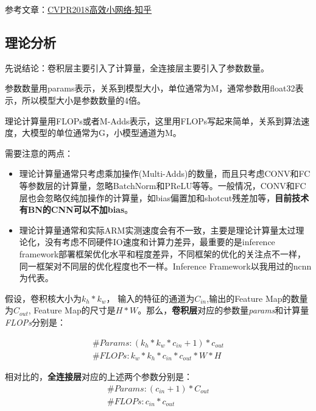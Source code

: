 参考文章：\href{https://zhuanlan.zhihu.com/p/37074222}{CVPR2018高效小网络-知乎}

\subsection{理论分析}

先说结论：卷积层主要引入了计算量，全连接层主要引入了参数数量。

参数数量用params表示，关系到模型大小，单位通常为M，通常参数用float32表示，所以模型大小是参数数量的4倍。

理论计算量用FLOPs或者M-Adds表示，这里用FLOPs写起来简单，关系到算法速度，大模型的单位通常为G，小模型通道为M。

需要注意的两点：
\begin{itemize}
\item 理论计算量通常只考虑乘加操作(Multi-Adds)的数量，而且只考虑CONV和FC等参数层的计算量，忽略BatchNorm和PReLU等等。一般情况，CONV和FC层也会忽略仅纯加操作的计算量，如bias偏置加和shotcut残差加等，\textbf{目前技术有BN的CNN可以不加bias}。

\item 理论计算量通常和实际ARM实测速度会有不一致，主要是理论计算量太过理论化，没有考虑不同硬件IO速度和计算力差异，最重要的是inference framework部署框架优化水平和程度差异，不同框架的优化的关注点不一样，同一框架对不同层的优化程度也不一样。Inference Framework以我用过的ncnn为代表。
\end{itemize}

假设，卷积核大小为$k_h * k_w$， 输入的特征的通道为$C_{in}$,输出的Feature Map的数量为$C_{out}$, Feature Map的尺寸是$H*W$。那么，\textbf{卷积层}对应的参数量\textit{params}和计算量\textit{FLOPs}分别是：

\begin{displaymath}
\begin{gathered}
\#Params: (k_h * k_w * c_{in} + 1) * c_{out} \\
\#FLOPs: k_w * k_h * c_{in} * c_{out} * W * H
\end{gathered}
\end{displaymath}

相对比的，\textbf{全连接层}对应的上述两个参数分别是：
\begin{displaymath}
\begin{gathered}
\#Params: (c_{in} + 1) * C_{out} \\
\#FLOPs: c_{in} * c_{out}
\end{gathered}
\end{displaymath}

